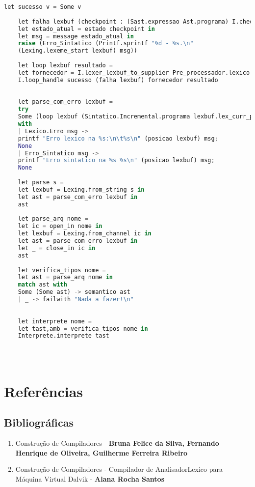\documentclass[hidelinks,12pt]{article}
\begin{document}
\begin{appendices}
\begin{lstlisting}[caption=interpreteTeste.ml, language=python]
	let sucesso v = Some v
	
	let falha lexbuf (checkpoint : (Sast.expressao Ast.programa) I.checkpoint) =
	let estado_atual = estado checkpoint in
	let msg = message estado_atual in
	raise (Erro_Sintatico (Printf.sprintf "%d - %s.\n"
	(Lexing.lexeme_start lexbuf) msg))
	
	let loop lexbuf resultado =
	let fornecedor = I.lexer_lexbuf_to_supplier Pre_processador.lexico lexbuf in
	I.loop_handle sucesso (falha lexbuf) fornecedor resultado
	
	
	let parse_com_erro lexbuf =
	try
	Some (loop lexbuf (Sintatico.Incremental.programa lexbuf.lex_curr_p))
	with
	| Lexico.Erro msg ->
	printf "Erro lexico na %s:\n\t%s\n" (posicao lexbuf) msg;
	None
	| Erro_Sintatico msg ->
	printf "Erro sintatico na %s %s\n" (posicao lexbuf) msg;
	None
	
	let parse s =
	let lexbuf = Lexing.from_string s in
	let ast = parse_com_erro lexbuf in
	ast
	
	let parse_arq nome =
	let ic = open_in nome in
	let lexbuf = Lexing.from_channel ic in
	let ast = parse_com_erro lexbuf in
	let _ = close_in ic in
	ast
	
	let verifica_tipos nome =
	let ast = parse_arq nome in
	match ast with
	Some (Some ast) -> semantico ast
	| _ -> failwith "Nada a fazer!\n"
	
	
	let interprete nome =
	let tast,amb = verifica_tipos nome in
	Interprete.interprete tast

	
	
	\end{lstlisting}
	
	
\end{appendices}
	
\newpage	
\section{Referências}

\subsection{Bibliográficas}
\begin{enumerate}
	\item Construção de Compiladores - \textbf{Bruna Felice da Silva, Fernando Henrique de Oliveira, Guilherme Ferreira Ribeiro }\label{Bruna}
	
	\item 
	Construção de Compiladores - Compilador de AnalisadorLexico para Máquina Virtual Dalvik - \textbf{Alana Rocha Santos}\label{Alana}
	
\end{enumerate}
\end{document}
